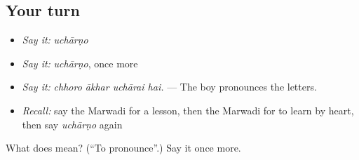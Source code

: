 \subsection*{Your turn}
\begin{itemize}
\raggedright
  \item \emph{Say it:} \emph{uchārṇo}
  \item \emph{Say it:} \emph{uchārṇo}, once more
  \item \emph{Say it:} \emph{chhoro ākhar uchārai hai.} — The boy pronounces the letters.
  \item \emph{Recall:} say the Marwadi for a lesson, then the Marwadi for to learn by heart, then say \emph{uchārṇo} again
\end{itemize}

\begin{tcolorbox}[breakable,colback=teal!4,colframe=teal!35!black,title={Before you move on}]
What does  mean? (\textquotedblleft{}To pronounce\textquotedblright{}.) Say it once more.
\end{tcolorbox}
